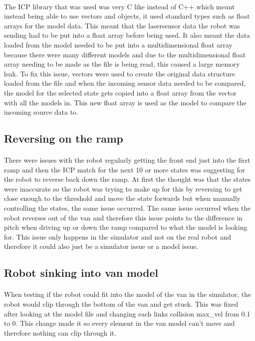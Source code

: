 \paragraph{}
The ICP library that was used was very C like instead of C++ which meant instead being able to use vectors and objects, it used standard types such as float arrays for the model data. This meant that the lasersensor data the robot was sending had to be put into a float array before being used. It also meant the data loaded from the model needed to be put into a multidimensional float array because there were many different models and due to the multidimensional float array needing to be made as the file is being read, this caused a large memory leak. To fix this issue, vectors were used to create the original data structure loaded from the file and when the incoming sensor data needed to be compared, the model for the selected state gets copied into a float array from the vector with all the models in. This new float array is used as the model to compare the incoming source data to.

\subsection{Reversing on the ramp}
\paragraph{}
There were issues with the robot regularly getting the front end just into the first ramp and then the ICP match for the next 10 or more states was suggesting for the robot to reverse back down the ramp. At first the thought was that the states were inaccurate so the robot was trying to make up for this by reversing to get close enough to the threshold and move the state forwards but when manually controlling the states, the same issue occurred. The same issue occurred when the robot reverses out of the van and therefore this issue points to the difference in pitch when driving up or down the ramp compared to what the model is looking for. This issue only happens in the simulator and not on the real robot and therefore it could also just be a simulator issue or a model issue.

\subsection{Robot sinking into van model}
\paragraph{}
When testing if the robot could fit into the model of the van in the simulator, the robot would clip through the bottom of the van and get stuck. This was fixed after looking at the model file and changing each links collision max\_vel from 0.1 to 0. This change made it so every element in the van model can't move and therefore nothing can clip through it.

